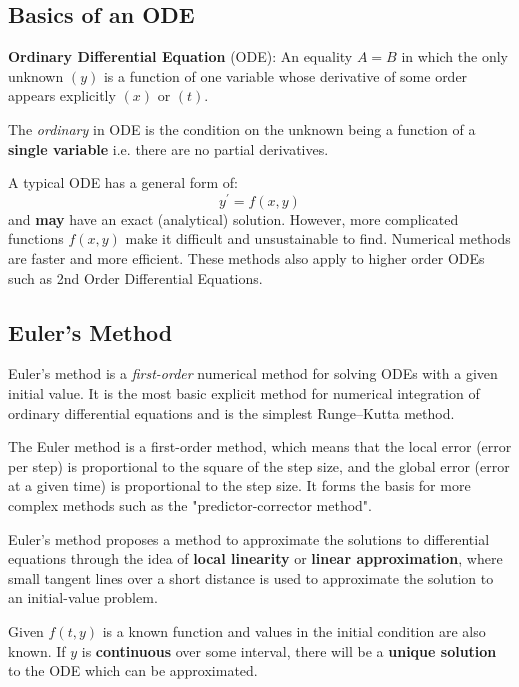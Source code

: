 \documentclass[10pt,a4paper]{article}
\begin{document}
\subsection{Basics of an ODE}

\begin{tcolorbox}[breakable,colback=white]
\textbf{Ordinary Differential Equation} (ODE): An equality $A=B$ in which the only unknown $(y)$ is
a function of one variable whose derivative of some order appears explicitly $(x)$ or $(t)$.
\end{tcolorbox}

The \textit{ordinary} in ODE is the condition on the unknown being a function of a \textbf{single
variable} i.e. there are no partial derivatives. 

A typical ODE has a general form of:
$$
y^{\prime}=f(x,y)
$$
and \textbf{may} have an exact (analytical) solution. However, more complicated functions $f(x,y)$ make
it difficult and unsustainable to find. Numerical methods are faster and more efficient. These
methods also apply to higher order ODEs such as 2nd Order Differential Equations.

\subsection{Euler's Method}

Euler's method is a \textit{first-order} numerical method for solving ODEs with a given initial
value. It is the most basic explicit method for numerical integration of ordinary differential
equations and is the simplest Runge–Kutta method. 

The Euler method is a first-order method, which means that the local error (error per step) is
proportional to the square of the step size, and the global error (error at a given time) is
proportional to the step size. It forms the basis for more complex methods such as the
"predictor-corrector method". 
 
Euler's method proposes a method to approximate the solutions to differential equations through the
idea of \textbf{local linearity} or \textbf{linear approximation}, where small tangent lines over a short
distance is used to approximate the solution to an initial-value problem.

Given $f(t,y)$ is a known function and values in the initial condition are also known. If $y$ is
\textbf{continuous} over some interval, there will be a \textbf{unique solution} to the ODE which
can be approximated.
\end{document}

